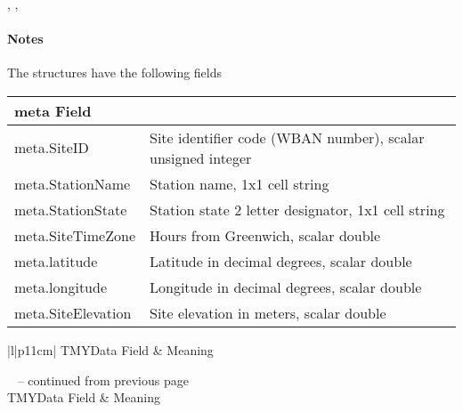 \documentclass[letterpaper,10pt,english]{sphinxmanual}
\begin{document}
\begin{fulllineitems}
\begin{quote}
\begin{description}
\end{description}\end{quote}




{\hyperref[stubs/pvlib.pvl_makelocationstruct:pvlib.pvl_makelocationstruct]{}}, , {\hyperref[stubs/pvlib.pvl_readtmy3:pvlib.pvl_readtmy3]{}}


\paragraph{Notes}

The structures have the following fields

\begin{tabulary}{\linewidth}{|L|L|}
\hline
\textsf{\relax 
meta Field
} & \textsf{\relax }\\
\hline
meta.SiteID
 & 
Site identifier code (WBAN number), scalar unsigned integer
\\

meta.StationName
 & 
Station name, 1x1 cell string
\\

meta.StationState
 & 
Station state 2 letter designator, 1x1 cell string
\\

meta.SiteTimeZone
 & 
Hours from Greenwich, scalar double
\\

meta.latitude
 & 
Latitude in decimal degrees, scalar double
\\

meta.longitude
 & 
Longitude in decimal degrees, scalar double
\\

meta.SiteElevation
 & 
Site elevation in meters, scalar double
\\
\hline\end{tabulary}


\begin{longtable}{|l|p{11cm}|}
\hline
\textsf{\relax 
TMYData Field
} & \textsf{\relax 
Meaning
}\\
\hline\endfirsthead

%
{{\textsf{\tablename\ \thetable{} -- continued from previous page}}} \\
\hline
\textsf{\relax 
TMYData Field
} & \textsf{\relax 
Meaning
}\\
\hline\endhead

\hline {} \\ \hline
\endfoot


\end{longtable}
\end{fulllineitems}
\end{document}
